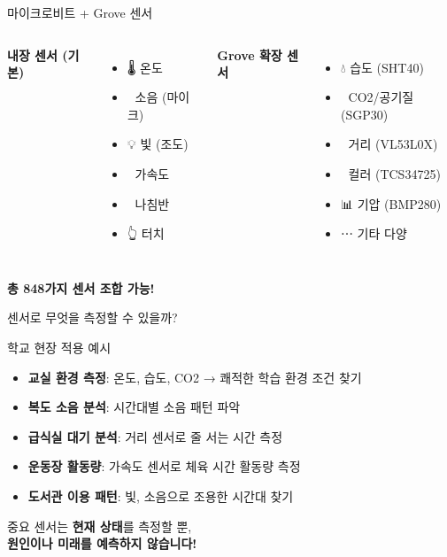 \documentclass[aspectratio=169]{beamer}
\begin{document}
\begin{frame}{마이크로비트 + Grove 센서}
  \begin{columns}
    \textbf{내장 센서 (기본)}
    \begin{itemize}
      \item 🌡️ 온도
      \item 🎤 소음 (마이크)
      \item 💡 빛 (조도)
      \item 📐 가속도
      \item 🧭 나침반
      \item 👆 터치
    \end{itemize}
    
    \textbf{Grove 확장 센서}
    \begin{itemize}
      \item 💧 습도 (SHT40)
      \item 💨 CO2/공기질 (SGP30)
      \item 📏 거리 (VL53L0X)
      \item 🎨 컬러 (TCS34725)
      \item 📊 기압 (BMP280)
      \item ⋯ 기타 다양
    \end{itemize}
  \end{columns}
  
  \vspace{1em}
  
  \begin{center}
    \textbf{총 848가지 센서 조합 가능!}
  \end{center}
\end{frame}

\begin{frame}{센서로 무엇을 측정할 수 있을까?}
  \begin{block}{학교 현장 적용 예시}
    \begin{itemize}
      \item \textbf{교실 환경 측정}: 온도, 습도, CO2 → 쾌적한 학습 환경 조건 찾기
      \item \textbf{복도 소음 분석}: 시간대별 소음 패턴 파악
      \item \textbf{급식실 대기 분석}: 거리 센서로 줄 서는 시간 측정
      \item \textbf{운동장 활동량}: 가속도 센서로 체육 시간 활동량 측정
      \item \textbf{도서관 이용 패턴}: 빛, 소음으로 조용한 시간대 찾기
    \end{itemize}
  \end{block}
  
  \vspace{0.5em}
  
  \begin{alertblock}{중요}
    센서는 \textbf{현재 상태}를 측정할 뿐,\\
    \textbf{원인이나 미래를 예측하지 않습니다!}
  \end{alertblock}
\end{frame}
\end{document}
